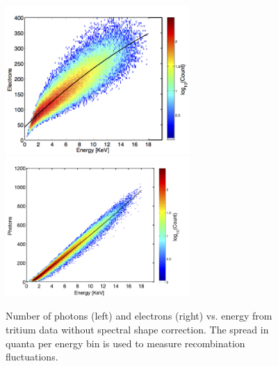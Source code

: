 \newpage 

 \begin{figure}[h!]\centering
\includegraphics[width=70mm]{Recombination_LY_QY/Figures/Iter0/n_electron_180_LY_QY_0.png}
\includegraphics[width=70mm]{Recombination_LY_QY/Figures/Iter0/n_photon_180_LY_QY_0.png}
\caption{Number of photons (left) and electrons (right) vs. energy from tritium data without spectral shape correction. The spread in quanta per energy bin is used to measure recombination fluctuations.}
\label{fig:LYQY_0}
\end{figure}

